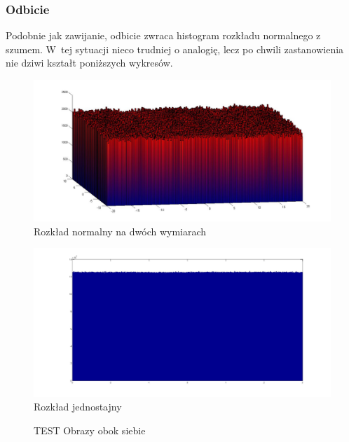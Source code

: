 \documentclass{mini}
\begin{document}
\subsubsection*{Odbicie}
Podobnie jak zawijanie, odbicie zwraca histogram rozkładu normalnego z szumem. W~tej sytuacji nieco trudniej o analogię, lecz po chwili zastanowienia nie dziwi kształt poniższych wykresów.
\begin{figure}[H]
\centering
\includegraphics[width=\textwidth]{rf_n_10M_2__20_20__10_10_4_2}
\caption{Rozkład normalny na dwóch wymiarach}
\end{figure}

\begin{figure}[H]
\centering
\includegraphics[width=\textwidth]{rf_j_100M_1__3_3}
\caption{Rozkład jednostajny}
\end{figure}

\begin{figure}[H]
\centering
{}
\quad
{}
\caption{TEST Obrazy obok siebie}
\end{figure}
\end{document}
